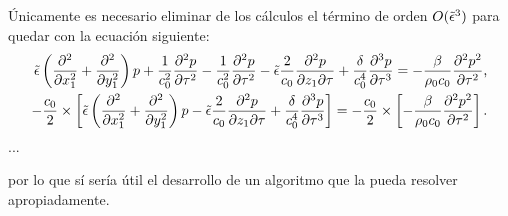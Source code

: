 %
Únicamente es necesario eliminar de los cálculos el término de orden $O(\tilde{\epsilon}^3)$ para quedar con la ecuación siguiente:
%
\begin{align}
\tilde{\epsilon}\left( \frac{\partial^2}{\partial x_1^2} +\frac{\partial^2}{\partial y_1^2}\right)p +\frac{1}{c_0^2}\frac{\partial^2p}{\partial \tau^2} - \frac{1}{c_0^2}\frac{\partial^2p}{\partial \tau^2} - \tilde{\epsilon} \frac{2}{c_0}\frac{\partial^2p}{\partial z_1\partial \tau}+ \frac{\delta}{c_0^4}\frac{\partial^3p}{\partial \tau^3} = -\frac{\beta}{\rho_0 c_0}\frac{\partial^2p^2}{\partial \tau^2}\text{,}\nonumber \\
-\frac{c_0}{2}\times\left[\tilde{\epsilon}\left( \frac{\partial^2}{\partial x_1^2} +\frac{\partial^2}{\partial y_1^2}\right)p - \tilde{\epsilon} \frac{2}{c_0} \frac{\partial^2p}{\partial z_1\partial \tau}+
\frac{\delta}{c_0^4}\frac{\partial^3p}{\partial \tau^3}\right]  = -\frac{c_0}{2}\times\left[-\frac{\beta}{\rho_0 c_0}\frac{\partial^2p^2}{\partial \tau^2}\right] \label{eqn:prekzk}\text{.}
\end{align}
%
...

por lo que sí sería útil el desarrollo de un algoritmo que la pueda resolver apropiadamente.

